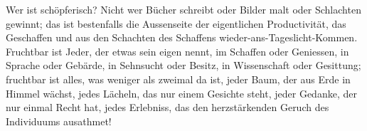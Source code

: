 Wer ist schöpferisch? Nicht wer Bücher schreibt oder Bilder malt oder Schlachten gewinnt; das ist bestenfalls die Aussenseite der eigentlichen Productivität, das Geschaffen und aus den Schachten des Schaffens wieder-ans-Tageslicht-Kommen. Fruchtbar ist Jeder, der etwas sein eigen nennt, im Schaffen oder Geniessen, in Sprache oder Gebärde, in Sehnsucht oder Besitz, in Wissenschaft oder Gesittung; fruchtbar ist alles, was weniger als zweimal da ist, jeder Baum, der aus  Erde in  Himmel wächst, jedes Lächeln, das nur einem Gesichte steht, jeder Gedanke, der nur einmal Recht hat, jedes Erlebniss, das den herzstärkenden Geruch des Individuums ausathmet!
\par

